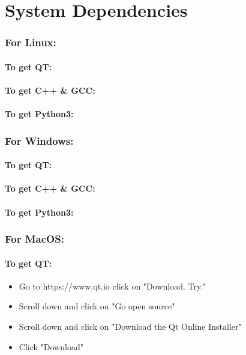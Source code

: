 \chapter{System Dependencies}
  \subsection{For Linux:}
  \subsubsection*{To get QT:}
  \subsubsection*{To get C++ & GCC:}
  \subsubsection*{To get Python3:}

  \bigskip
  \subsection{For Windows:}
  \subsubsection*{To get QT:}
  \subsubsection*{To get C++ & GCC:}
  \subsubsection*{To get Python3:}

  \bigskip
  \subsection{For MacOS:}
  \subsubsection*{To get QT:}
    \begin{itemize}
      \item Go to https://www.qt.io click on "Download. Try."
      \item Scroll down and click on "Go open source"
      \item Scroll down and click on "Download the Qt Online Installer"
      \item Click "Download"
    \end{itemize}
